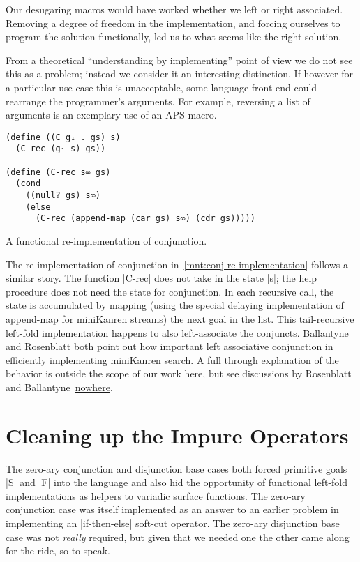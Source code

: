 \documentclass[sigplan,screen,draft,anonymous,review,natbib=false]{acmart}
\begin{document}
Our desugaring macros would have worked whether we left or right
associated. Removing a degree of freedom in the implementation, and
forcing ourselves to program the solution functionally, led us to what
seems like the right solution.

From a theoretical \enquote{understanding by implementing} point of
view we do not see this as a problem; instead we consider it an
interesting distinction. If however for a particular use case this is
unacceptable, some language front end could rearrange the programmer's
arguments. For example, reversing a list of arguments is an exemplary
use of an APS macro.

\begin{listing}
  \begin{verbatim}
(define ((C g₁ . gs) s)
  (C-rec (g₁ s) gs))

(define (C-rec s∞ gs)
  (cond
    ((null? gs) s∞)
    (else
      (C-rec (append-map (car gs) s∞) (cdr gs)))))
  \end{verbatim}
  \caption{A functional re-implementation of conjunction.}
  \label{mnt:conj-re-implementation}
\end{listing}

The re-implementation of conjunction
in~\cref{mnt:conj-re-implementation} follows a similar story. The
function \rackinline|C-rec| does not take in the state \rackinline|s|;
the help procedure does not need the state for conjunction. In each
recursive call, the state is accumulated by mapping (using the special
delaying implementation of append-map for miniKanren streams) the next
goal in the list. This tail-recursive left-fold implementation happens
to also left-associate the conjuncts. Ballantyne and Rosenblatt both
point out how important left associative conjunction in efficiently
implementing miniKanren search. A full through explanation of the
behavior is outside the scope of our work here, but see discussions by
Rosenblatt and Ballantyne~\href{here}{nowhere}.


\section{Cleaning up the Impure Operators}\label{sec:impure}

The zero-ary conjunction and disjunction base cases both forced
primitive goals \rackinline|S| and \rackinline|F| into the language
and also hid the opportunity of functional left-fold implementations
as helpers to variadic surface functions. The zero-ary conjunction
case was itself implemented as an answer to an earlier problem in
implementing an \rackinline|if-then-else| soft-cut operator. The
zero-ary disjunction base case was not \emph{really} required, but
given that we needed one the other came along for the ride, so to
speak.
\end{document}
